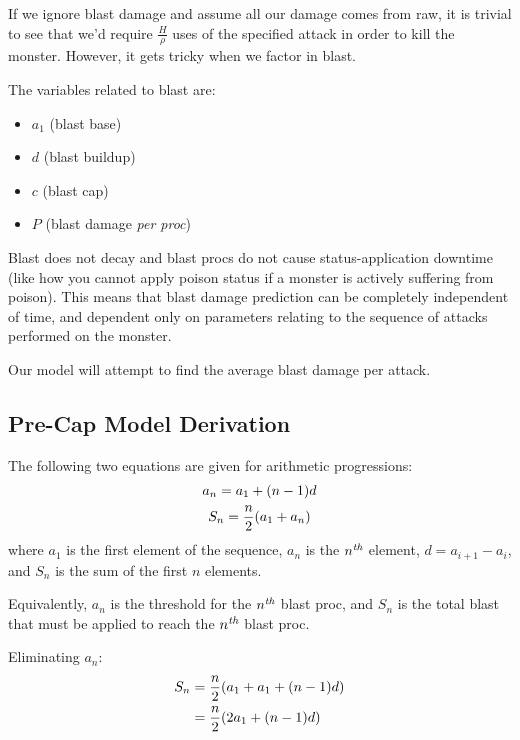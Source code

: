 \documentclass{article}
\begin{document}
If we ignore blast damage and assume all our damage comes from raw, it is trivial to see that we'd require $\frac{H}{\rho}$ uses of the specified attack in order to kill the monster. However, it gets tricky when we factor in blast.

The variables related to blast are:
\begin{itemize}
    \item $a_1$ (blast base)
    \item $d$ (blast buildup)
    \item $c$ (blast cap)
    \item $P$ (blast damage \textit{per proc})
\end{itemize}

Blast does not decay and blast procs do not cause status-application downtime (like how you cannot apply poison status if a monster is actively suffering from poison). This means that blast damage prediction can be completely independent of time, and dependent only on parameters relating to the sequence of attacks performed on the monster.

Our model will attempt to find the average blast damage per attack.


\subsection{Pre-Cap Model Derivation}%
\label{sub:pre_cap_model_derivation}

The following two equations are given for arithmetic progressions:
\begin{gather}
    a_n = a_1 + \parens*{n - 1} d
        \label{eq:arithmetic_progression_element}
    \\
    S_n = \frac{n}{2} \parens*{a_1 + a_n}
        \label{eq:arithmetic_progression_sum}
\end{gather}
where $a_1$ is the first element of the sequence, $a_n$ is the ${n}^\textit{th}$ element, $d = a_{i+1} - a_{i}$, and $S_n$ is the sum of the first $n$ elements.

Equivalently, $a_n$ is the threshold for the ${n}^\textit{th}$ blast proc, and $S_n$ is the total blast that must be applied to reach the ${n}^\textit{th}$ blast proc.

Eliminating $a_n$:
\begin{align}
    S_n &= \frac{n}{2} \parens*{a_1 + a_1 + \parens*{n - 1} d} \\
        &= \frac{n}{2} \parens*{2 a_1 + \parens*{n - 1} d}
\end{align}
\end{document}
